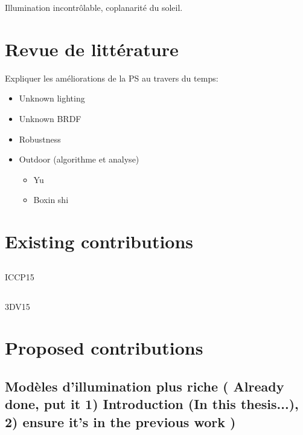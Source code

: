 \documentclass{report}
\begin{document}
Illumination incontrôlable, coplanarité du soleil.


\chapter{Revue de littérature}

Expliquer les améliorations de la PS au travers du temps:
\begin{itemize}
	\item Unknown lighting
	\item Unknown BRDF
	\item Robustness
	\item Outdoor (algorithme et analyse)
	\begin{itemize}
		\item Yu
		\item Boxin shi
	\end{itemize}
\end{itemize}



\chapter{Existing contributions}


\section{}
ICCP15

\section{}
3DV15


\chapter{Proposed contributions}

\section{Modèles d'illumination plus riche ( Already done, put it 1) Introduction (In this thesis...), 2) ensure it's in the previous work )}
\end{document}
